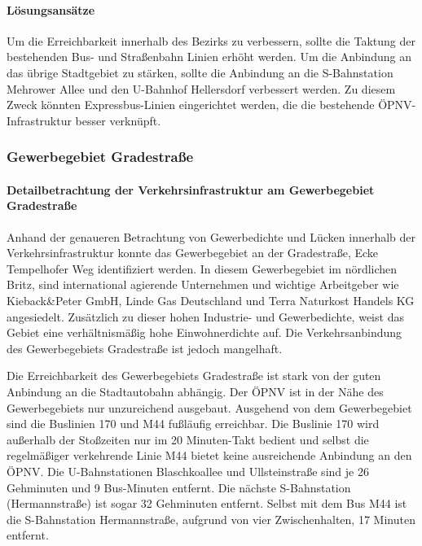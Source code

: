 \paragraph{Lösungsansätze}
Um die Erreichbarkeit innerhalb des Bezirks zu verbessern, sollte die Taktung der bestehenden Bus- und Straßenbahn Linien erhöht werden. Um die Anbindung an das übrige Stadtgebiet zu stärken, sollte die Anbindung an die S-Bahnstation Mehrower Allee und den U-Bahnhof Hellersdorf verbessert werden. Zu diesem Zweck könnten Expressbus-Linien eingerichtet werden, die die bestehende ÖPNV-Infrastruktur besser verknüpft.


\subsubsection{Gewerbegebiet Gradestraße}
\paragraph{Detailbetrachtung der Verkehrsinfrastruktur am Gewerbegebiet Gradestraße}
Anhand der genaueren Betrachtung von Gewerbedichte und Lücken innerhalb der Verkehrsinfrastruktur konnte das Gewerbegebiet an der Gradestraße, Ecke Tempelhofer Weg identifiziert werden. In diesem Gewerbegebiet im nördlichen Britz, sind international agierende Unternehmen und wichtige Arbeitgeber wie Kieback\&Peter GmbH, Linde Gas Deutschland und Terra Naturkost Handels KG angesiedelt. Zusätzlich zu dieser hohen Industrie- und Gewerbedichte, weist das Gebiet eine verhältnismäßig hohe Einwohnerdichte auf. Die Verkehrsanbindung des Gewerbegebiets Gradestraße ist jedoch mangelhaft.


Die Erreichbarkeit des Gewerbegebiets Gradestraße ist stark von der guten Anbindung an die Stadtautobahn abhängig. Der ÖPNV ist in der Nähe des Gewerbegebiets nur unzureichend ausgebaut. Ausgehend von dem Gewerbegebiet sind die Buslinien 170 und M44 fußläufig erreichbar. Die Buslinie 170 wird außerhalb der Stoßzeiten nur im 20 Minuten-Takt bedient und selbst die regelmäßiger verkehrende Linie M44 bietet keine ausreichende Anbindung an den ÖPNV. Die U-Bahnstationen Blaschkoallee und Ullsteinstraße sind je 26 Gehminuten und 9 Bus-Minuten entfernt. Die nächste S-Bahnstation (Hermannstraße) ist sogar 32 Gehminuten entfernt. Selbst mit dem Bus M44 ist die S-Bahnstation Hermannstraße, aufgrund von vier Zwischenhalten, 17 Minuten entfernt.

